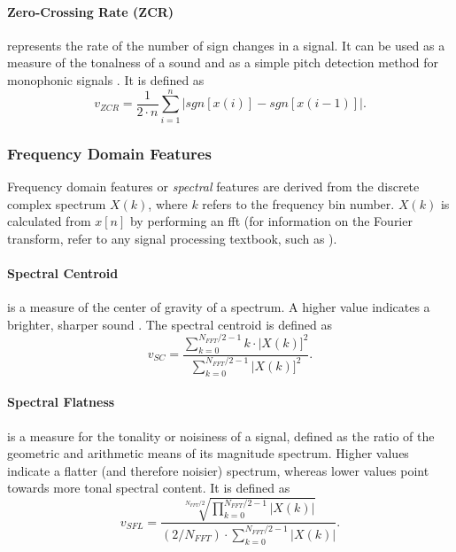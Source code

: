 \paragraph*{Zero-Crossing Rate (ZCR)}
\label{para:zcr}
represents the rate of the number of sign changes in a signal.
It can be used as a measure of the tonalness of a sound \citep{lykartsis2014}
and as a simple pitch detection method for monophonic signals \citep{web:pitchdetection2019}. It is defined as
\begin{equation}
  v_{ZCR} = \frac{1} {2\cdot{n}}\sum\limits_{i=1}^{n} |sgn[x(i)] - sgn[x(i - 1)]|.
\end{equation}

\subsubsection{Frequency Domain Features}
\label{subsubsec:spectral_features}
Frequency domain features or \textit{spectral} features are derived from the
discrete complex spectrum $X(k)$, where $k$ refers to the frequency bin number.
$X(k)$ is calculated from $x[n]$ by performing an \gls{fft} (for information on
the Fourier transform, refer to any signal processing textbook, such as
\citet{oppenheim2014}).

\paragraph*{Spectral Centroid}
\label{para:centroid}
is a measure of the center of gravity of a
spectrum. A higher value indicates a brighter, sharper sound \citep{lerch2012}.
The spectral centroid is defined as
\begin{equation}
  v_{SC} = \frac{ \sum\limits_{k=0}^{N_{FFT}/2-1} k\cdot{|X(k)]^2} }
  { \sum\limits_{k=0}^{N_{FFT}/2-1} |X(k)]^2 }.
\end{equation}

\paragraph*{Spectral Flatness}
\label{para:flatness}
is a measure for the tonality or noisiness of a signal, defined as the ratio of
the geometric and arithmetic means of its magnitude spectrum. Higher values
indicate a flatter (and therefore noisier) spectrum, whereas lower values point
towards more tonal spectral content. It is defined as
\begin{equation}
  v_{SFL} = \frac{ \sqrt[N_{FFT}/2]{ \prod\limits_{k=0}^{N_{FFT}/2-1} |X(k)| } }
  { (2/N_{FFT}) \cdot{\sum\limits_{k=0}^{N_{FFT}/2-1} |X(k)|} }.
\end{equation}

